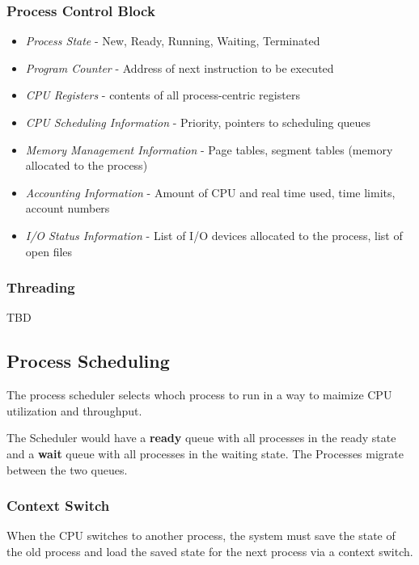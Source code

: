 \documentclass[]{article}
\begin{document}
\subsubsection*{Process Control Block}

\begin{itemize}
    \item \emph{Process State} - New, Ready, Running, Waiting, Terminated
    \item \emph{Program Counter} - Address of next instruction to be executed
    \item \emph{CPU Registers} - contents of all process-centric registers
    \item \emph{CPU Scheduling Information} - Priority, pointers to scheduling queues
    \item \emph{Memory Management Information} - Page tables, segment tables (memory allocated to the process)
    \item \emph{Accounting Information} - Amount of CPU and real time used, time limits, account numbers
    \item \emph{I/O Status Information} - List of I/O devices allocated to the process, list of open files
\end{itemize}

\subsubsection*{Threading}

TBD

\subsection{Process Scheduling}

The process scheduler selects whoch process to run in a way to maimize CPU utilization and throughput.

The Scheduler would have a \textbf{ready} queue with all processes in the ready state and a \textbf{wait} queue with all processes in the waiting state. The Processes migrate between the two queues. 

\subsubsection*{Context Switch}

When the CPU switches to another process, the system must save the state of the old process and load the saved state for the next process via a context switch.
\end{document}

